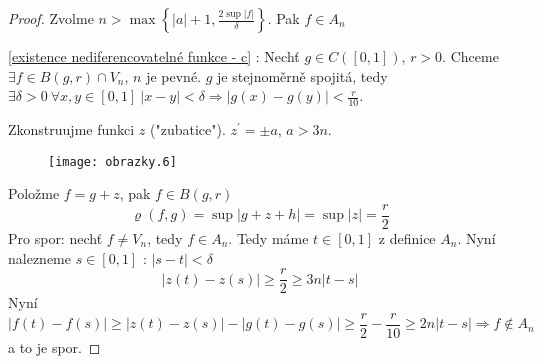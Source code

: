 \begin{proof}
Zvolme $n > \max \left\{ |a|+1, \frac{2 \sup |f|}{\delta} \right\}$. Pak $f \in A_n$

\ref{existence nediferencovatelné funkce - c} : Nechť $g \in C([0,1])$, $r > 0$. Chceme $\exists f \in B(g,r) \cap V_n$, $n$ je pevné. $g$ je stejnoměrně spojitá, tedy $\exists \delta > 0 \ \forall x,y \in [0,1] \ |x-y| < \delta \Rightarrow |g(x)-g(y)| < \frac{r}{10}$.

Zkonstruujme funkci $z$ ("zubatice"). $z^\prime = \pm a$, $a > 3n$.

\begin{figure}[!hp] \begin{center}
\texttt{[image: obrazky.6]}
\end{center} \end{figure}


Položme $f = g + z$, pak $f \in B(g,r)$
$$\varrho (f,g) = \sup |g + z + h| = \sup |z| = \frac{r}{2}$$
Pro spor: nechť $f \neq V_n$, tedy $f \in A_n$. Tedy máme $t \in [0,1]$ z definice $A_n$. Nyní nalezneme $s \in [0,1] \textrm{ : } |s-t| < \delta$
$$|z(t)-z(s)| \geq \frac{r}{2} \geq 3 n |t-s|$$
Nyní
$$|f(t)-f(s)| \geq |z(t)-z(s)|-|g(t)-g(s)| \geq \frac{r}{2} - \frac{r}{10} \geq 2 n |t-s| \Rightarrow f \notin A_n$$
a to je spor.
\end{proof}




